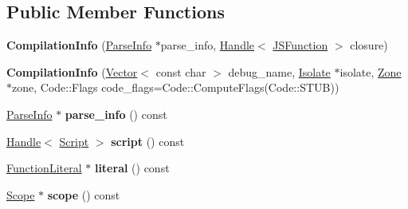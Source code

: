 \subsection*{Public Member Functions}
\begin{DoxyCompactItemize}
\item 
{\bfseries Compilation\+Info} (\hyperlink{classv8_1_1internal_1_1_parse_info}{Parse\+Info} $\ast$parse\+\_\+info, \hyperlink{classv8_1_1internal_1_1_handle}{Handle}$<$ \hyperlink{classv8_1_1internal_1_1_j_s_function}{J\+S\+Function} $>$ closure)\hypertarget{classv8_1_1internal_1_1_compilation_info_a1601fbdbeff9fc8263eaf86250e5470a}{}\label{classv8_1_1internal_1_1_compilation_info_a1601fbdbeff9fc8263eaf86250e5470a}

\item 
{\bfseries Compilation\+Info} (\hyperlink{classv8_1_1internal_1_1_vector}{Vector}$<$ const char $>$ debug\+\_\+name, \hyperlink{classv8_1_1internal_1_1_isolate}{Isolate} $\ast$isolate, \hyperlink{classv8_1_1internal_1_1_zone}{Zone} $\ast$zone, Code\+::\+Flags code\+\_\+flags=Code\+::\+Compute\+Flags(Code\+::\+S\+T\+UB))\hypertarget{classv8_1_1internal_1_1_compilation_info_a7ad1db1b892f9c05aa62068c46da1d59}{}\label{classv8_1_1internal_1_1_compilation_info_a7ad1db1b892f9c05aa62068c46da1d59}

\item 
\hyperlink{classv8_1_1internal_1_1_parse_info}{Parse\+Info} $\ast$ {\bfseries parse\+\_\+info} () const \hypertarget{classv8_1_1internal_1_1_compilation_info_a1f6f32c9c3a66fe544252d6723b5edd9}{}\label{classv8_1_1internal_1_1_compilation_info_a1f6f32c9c3a66fe544252d6723b5edd9}

\item 
\hyperlink{classv8_1_1internal_1_1_handle}{Handle}$<$ \hyperlink{classv8_1_1internal_1_1_script}{Script} $>$ {\bfseries script} () const \hypertarget{classv8_1_1internal_1_1_compilation_info_a997d0d15d1175bf61948716b9fba9855}{}\label{classv8_1_1internal_1_1_compilation_info_a997d0d15d1175bf61948716b9fba9855}

\item 
\hyperlink{classv8_1_1internal_1_1_function_literal}{Function\+Literal} $\ast$ {\bfseries literal} () const \hypertarget{classv8_1_1internal_1_1_compilation_info_ab57036e5840f04ca01bcf7279e44f79d}{}\label{classv8_1_1internal_1_1_compilation_info_ab57036e5840f04ca01bcf7279e44f79d}

\item 
\hyperlink{classv8_1_1internal_1_1_scope}{Scope} $\ast$ {\bfseries scope} () const \hypertarget{classv8_1_1internal_1_1_compilation_info_af4d767ed84e91bd7fdd05807178f2888}{}\label{classv8_1_1internal_1_1_compilation_info_af4d767ed84e91bd7fdd05807178f2888}


\end{DoxyCompactItemize}
